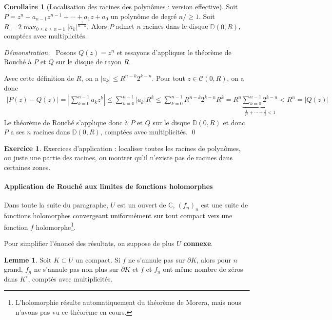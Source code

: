 \documentclass[11pt,a4paper]{book}
\newcommand{\D}{\mathbb{D}}
\newcommand{\C}{\mathbb{C}}
\newcommand\abs[1]{\left|#1\right|}
\theoremstyle{definition}
\newtheorem{corollaire}[theoreme]{Corollaire}
\newtheorem{lemme}[theoreme]{Lemme}
\renewenvironment{proof}{\color{preuve}\emph{Démonstration.~}}{\qed}
\newtheorem{ex}{Exercice}
\theoremstyle{plain}
\newenvironment{exo}{\begin{ex}\label{enonce.\theex} }{\end{ex} }
\begin{document}
\begin{corollaire}[Localisation des racines des polynômes : version effective]
Soit $P=z^n + a_{n-1}z^{n-1}+\cdots + a_1z + a_0$ un polynôme de degré $n/\geq 1$.
Soit $R  = 2\max_{0\leq k\leq n-1} |a_k|^{\frac{1}{n-k}}$.
Alors $P$ admet $n$ racines dans le disque $\D(0,R)$, comptées avec multiplicités.
\end{corollaire}
\begin{proof}
Posons $Q(z)=z^n$ et essayons d'appliquer le théorème de Rouché à $P$ et $Q$ sur le disque de rayon $R$.

Avec cette définition de $R$, on a $|a_k| \leq R^{n-k}2^{k-n}$.
Pour tout $z\in \mathcal C(0,R)$, on a donc
\begin{align*}
\abs{P(z)-Q(z)} 
=  \abs{\sum_{k=0}^{n-1}a_kz^k}
\leq \sum_{k=0}^{n-1} \abs{a_k}R^k
\leq \sum_{k=0}^{n-1} R^{n-k}2^{k-n}R^k
= R^n \underbrace{\sum_{k=0}^{n-1} 2^{k-n}}_{\frac{1}{2^n}+\cdots +\frac{1}{2} < 1}
\boxed{<R^n =  \abs{Q(z)} }
\end{align*}
Le théorème de Rouché s'applique donc à $P$ et $Q$ sur le disque $\D(0,R)$ et donc $P$ a ses $n$ racines dans $\D(0,R)$, comptées avec multiplicités.
\end{proof}

\begin{exo} Exercices d'application : localiser toutes les racines de polynômes, ou juste une partie des racines, ou montrer qu'il n'existe pas de racines dans certaines zones.
\end{exo}

\paragraph{Application de Rouché aux limites de fonctions holomorphes}

Dans toute la suite du paragraphe, $U$ est un ouvert de $\C$, $(f_n)_n$ est une suite de fonctions holomorphes convergeant uniformément sur tout compact vers une fonction $f$ holomorphe\footnote{L'holomorphie résulte automatiquement du théorème de Morera, mais nous n'avons pas vu ce théorème en cours.}.

Pour simplifier l'énoncé des résultats, on suppose de plus $U$ \textbf{connexe}.

\begin{lemme}
Soit $K \subset U$ un compact. Si $f$ ne s'annule pas sur $\partial K$, alors pour $n$ grand, $f_n$ ne s'annule pas non plus sur $\partial K$ et $f$ et $f_n$ ont même nombre de zéros dans $K^\circ$, comptés avec multiplicités.
\end{lemme}
\end{document}
